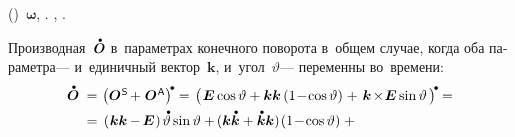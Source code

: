 \begin{otherlanguage}{russian}
()~${\bm{\omega}}$,
.
,
.

Производная~${\mathdotabove{\rotationtensor}}$
в~параметрах конечного поворота
в~общем случае,
когда оба параметра\:---
и~единичный вектор~$\bm{k}$,
и~угол~$\vartheta$\:---
переменны во~времени\::
\vspace{.3em}%
\[
\begin{array}{r@{\hspace{.33em}}c@{\hspace{.25em}}l}
\mathdotabove{\rotationtensor} \hspace{.2em} & = & \hspace{.1em} \left(\rotationtensor^{\mathsf{\hspace{.12ex}S}} \hspace{-0.2ex} +^{\mathstrut} \rotationtensor^{\mathsf{\hspace{.12ex}A}}\right)^{\hspace{-0.2ex}\tikz[baseline=-0.5ex]\draw[black, fill=black] (0,0) circle (.266ex);} =
\hspace{.1em} \left(\hspace{.2ex} \tikzmark{StartBracePs} {\UnitDyad \cosine \vartheta + \bm{k} \bm{k} \left({1 \!-\! \cosine \vartheta}\right)} \hspace{-0.2ex} \tikzmark{EndBracePs} \hspace{.32ex} +^{\mathstrut} \hspace{.2ex}
\tikzmark{StartBracePa} {\bm{k} \hspace{-0.24ex}\times\hspace{-0.4ex} \UnitDyad \sine \vartheta \hspace{.2ex}} \tikzmark{EndBracePa} {} \hspace{.16ex}\right)^{\hspace{-0.2ex}\tikz[baseline=-0.5ex]\draw[black, fill=black] (0,0) circle (.266ex);} \hspace{-0.05em} =
\\[0.4em]
%
& = & \hspace{.2em} \tikzmark{StartBraceDotPs} {\left( \hspace{.1ex} \bm{k} \bm{k} \hspace{-0.1ex} - \hspace{-0.2ex} \UnitDyad \hspace{.1ex} \right) \hspace{-0.1ex} \mathdotabove{\vartheta} \sine \vartheta + \hspace{-0.2ex} ( \bm{k} \mathdotabove{\bm{k}} + \mathdotabove{\bm{k}} \bm{k} ) \hspace{-0.2ex} \left({1 \!-\! \cosine \vartheta}\right)} \tikzmark{EndBraceDotPs} \hspace{.64ex} + \\[0.64em]

\end{array}\]
\end{otherlanguage}
